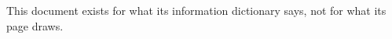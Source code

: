 \documentclass{article}
\begin{document}
This document exists for what its information dictionary says, not for what its page
draws.
\end{document}
